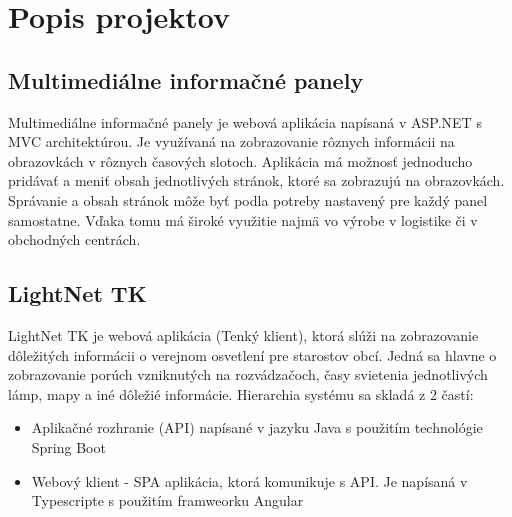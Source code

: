 \documentclass[11pt, oneside]{report}
\begin{document}
\listoffigures

\newpage 

\listoftables
{}




 



\chapter{Popis projektov}
\section{Multimediálne informačné panely}
Multimediálne informačné panely\cite{panely} je webová aplikácia napísaná v ASP.NET s MVC architektúrou. Je využívaná na zobrazovanie rôznych  informácii na obrazovkách v rôznych časových slotoch. Aplikácia má  možnosť  jednoducho pridávať a meniť obsah  jednotlivých stránok, ktoré sa zobrazujú na obrazovkách.  Správanie a obsah stránok môže byť podla potreby nastavený pre každý panel samostatne. Vďaka tomu má široké využitie najmä  vo výrobe v logistike či v obchodných centrách.
\section{LightNet TK}
LightNet TK je webová aplikácia (Tenký klient), ktorá slúži na zobrazovanie dôležitých informácii o verejnom osvetlení pre starostov obcí. Jedná sa hlavne o zobrazovanie porúch vzniknutých na rozvádzačoch, časy svietenia jednotlivých lámp, mapy a iné dôležié informácie. Hierarchia systému sa  skladá z 2 častí:
\begin{itemize}
\item Aplikačné rozhranie (API) napísané v jazyku Java s použitím technológie Spring Boot
\item Webový klient - SPA aplikácia, ktorá komunikuje s API. Je napísaná v Typescripte s použitím framweorku Angular
\end{itemize} 
\end{document}

